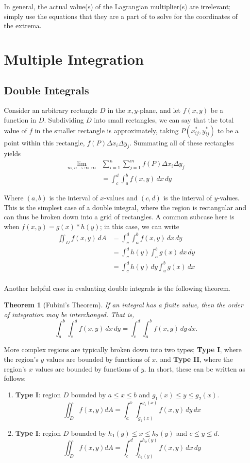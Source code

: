 \documentclass[12pt]{article}
\newtheorem{theorem}{Theorem}
\begin{document}
{In general, the actual value(s) of the Lagrangian multiplier(s) are irrelevant; simply use the equations that they are a part of to solve for the coordinates of the extrema.

\section{Multiple Integration}
\subsection{Double Integrals}
Consider an arbitrary rectangle $D$ in the $x,y$-plane, and let $f(x,y)$ be a function in $D$. Subdividing $D$ into small rectangles, we can say that the total value of $f$ in the smaller rectangle is approximately, taking $P(x^*_{ij}, y^*_{ij})$ to be a point within this rectangle, $f(P) \Delta x_i \Delta y_j$. Summating all of these rectangles yields \begin{align*}
    \lim_{m, n \to \infty, \infty}& \sum_{i = 1}^n \sum_{j=1}^m f(P) \Delta x_i \Delta y_j \\
    &= \int_c^d \int_a^b f(x,y) \, dx \, dy
\end{align*}

Where $(a,b)$ is the interval of $x$-values and $(c,d)$ is the interval of $y$-values. This is the simplest case of a double integral, where the region is rectangular and can thus be broken down into a grid of rectangles. A common subcase here is when $f(x,y) = g(x) * h(y)$; in this case, we can write \begin{align*}
   \iint_D f(x,y) \, dA &= \int_c^d \int_a^b f(x,y) \, dx \, dy\\
   &= \int_c^d h(y) \int_a^b g(x) \, dx \, dy\\
   &= \int_c^d h(y) \, dy \int_a^b g(x) \, dx\\
\end{align*}

Another helpful case in evaluating double integrals is the following theorem.

\begin{theorem}[Fubini's Theorem]
    If an integral has a finite value, then the order of integration may be interchanged. That is, \[\int_a^b \int_c^d f(x,y) \,dx\,dy = \int_c^d \int_a^b f(x,y) \,dy \,dx.\]
\end{theorem}

More complex regions are typically broken down into two types; \textbf{Type I}, where the region's $y$ values are bounded by functions of $x$, and \textbf{Type II}, where the region's $x$ values are bounded by functions of $y$. In short, these can be written as follows:
\begin{enumerate}
    \item \textbf{Type I}: region $D$ bounded by $a \leq x \leq b$ and $g_1(x) \leq y \leq g_2(x)$. \[\iint_D f(x,y) dA = \int_a^b \int_{g_1(x)}^{g_2(x)} f(x,y) \,dy \,dx\]
    \item \textbf{Type I}: region $D$ bounded by $h_1(y) \leq x \leq h_2(y)$ and $c \leq y \leq d$. \[\iint_D f(x,y) dA = \int_c^d \int_{h_1(y)}^{h_2(y)} f(x,y) \, dx \, dy\]
\end{enumerate}

}
\end{document}
